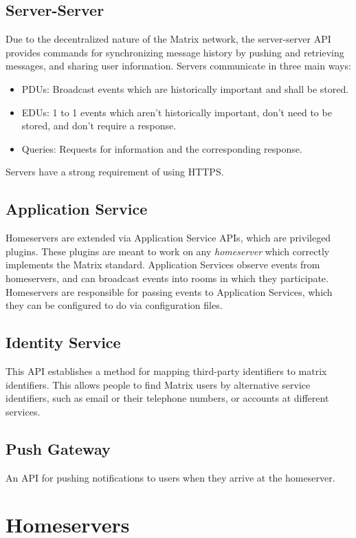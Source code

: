 \subsection{Server-Server}
Due to the decentralized nature of the Matrix network, the server-server \ac{API} provides commands for synchronizing message history by pushing and retrieving messages, and sharing user information.
Servers communicate in three main ways:
\begin{itemize}
    \item \ac{PDU}s: Broadcast events which are historically important and shall be stored.
    \item \ac{EDU}s: 1 to 1 events which aren't historically important, don't need to be stored, and don't require a response.
    \item Queries: Requests for information and the corresponding response.
\end{itemize}
Servers have a strong requirement of using \ac{HTTPS}.

\subsection{Application Service}
Homeservers are extended via Application Service \ac{API}s, which are privileged plugins.
These plugins are meant to work on any \textit{homeserver} which correctly implements the Matrix standard.
Application Services observe events from homeservers, and can broadcast events into rooms in which they participate.
Homeservers are responsible for passing events to Application Services, which they can be configured to do via configuration files.

\subsection{Identity Service}
This \ac{API} establishes a method for mapping third-party identifiers to matrix identifiers.
This allows people to find Matrix users by alternative service identifiers, such as email or their telephone numbers, or accounts at different services.

\subsection{Push Gateway}
An API for pushing notifications to users when they arrive at the homeserver.

\section{Homeservers}
